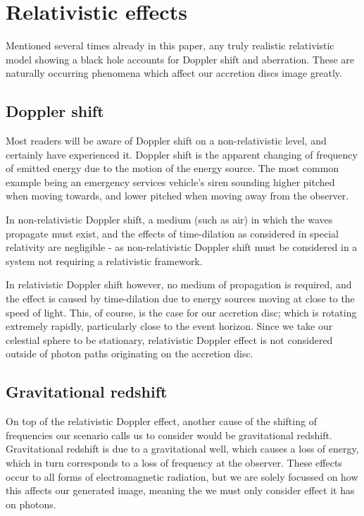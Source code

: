 \documentclass[oneside,openright,frontopenright, singlespacing]{dmathesis}
\begin{document}
\section{Relativistic effects}\label{sec:Section5.2}

	Mentioned several times already in this paper, any truly realistic relativistic model showing a black hole accounts for Doppler shift and aberration. These are naturally occurring phenomena which affect our accretion discs image greatly.

\subsection{Doppler shift}\label{subsec:Subsection5.2.1}

	Most readers will be aware of Doppler shift on a non-relativistic level, and certainly have experienced it. Doppler shift is the apparent changing of frequency of emitted energy due to the motion of the energy source. The most common example being an emergency services vehicle's siren sounding higher pitched when moving towards, and lower pitched when moving away from the observer.

\vspace{1em}
	In non-relativistic Doppler shift, a medium (such as air) in which the waves propagate must exist, and the effects of time-dilation as considered in special relativity are negligible - as non-relativistic Doppler shift must be considered in a system not requiring a relativistic framework.

\vspace{1em}
	In relativistic Doppler shift however, no medium of propagation is required, and the effect is caused by time-dilation due to energy sources moving at close to the speed of light. This, of course, is the case for our accretion disc; which is rotating extremely rapidly, particularly close to the event horizon. Since we take our celestial sphere to be stationary, relativistic Doppler effect is not considered outside of photon paths originating on the accretion disc.

\subsection{Gravitational redshift}\label{subsec:Subsection5.2.2}

	On top of the relativistic Doppler effect, another cause of the shifting of frequencies our scenario calls us to consider would be gravitational redshift. Gravitational redshift is due to a gravitational well, which causes a loss of energy, which in turn corresponds to a loss of frequency at the observer. These effects occur to all forms of electromagnetic radiation, but we are solely focussed on how this affects our generated image, meaning the we must only consider effect it has on photons.
\end{document}
